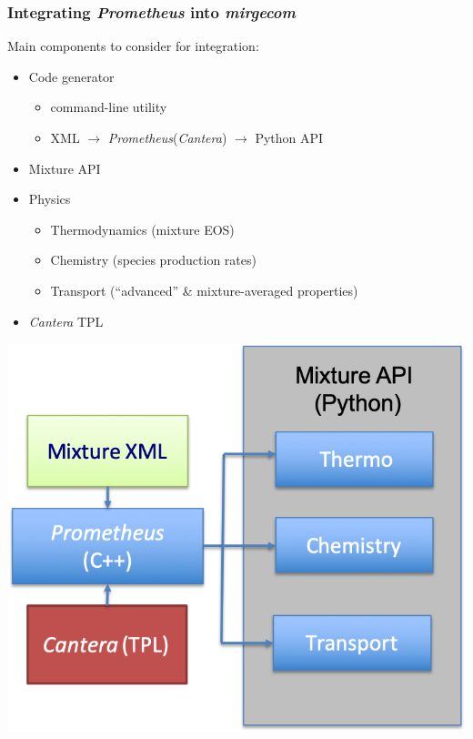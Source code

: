 \def\CC{{C\nolinebreak[4]\hspace{-.05em}\raisebox{.4ex}{\tiny\bf ++}}}

\begin{frame}\frametitle{Integrating \textit{Prometheus} into \textit{mirgecom}}
Main components to consider for integration:
\begin{multicols}{2}
\begin{itemize}
  \item Code generator
  \begin{itemize}
    \item {} command-line utility 
    \item XML $\rightarrow$ \textit{Prometheus}(\textit{Cantera}) $\rightarrow$ Python API 
  \end{itemize}
  \item Mixture API
  \item Physics
  \begin{itemize}
    \item Thermodynamics (mixture EOS)
    \item Chemistry (species production rates)
    \item Transport (``advanced'' \& mixture-averaged properties)
  \end{itemize}
\item \textit{Cantera} TPL
\end{itemize}
\includegraphics[width=.5\textwidth]{figures/prometheus_cartoon.png}
\end{multicols}
\end{frame}

